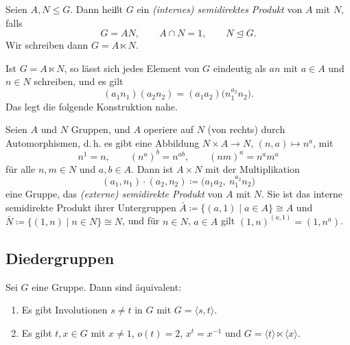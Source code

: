\documentclass[11pt]{article}
\begin{document}
\begin{ergaenzung}
\begin{definition}\Theorem
  Seien $A, N \le G$. Dann heißt $G$ ein \emph{(internes) semidirektes Produkt} von $A$ mit $N$, falls
  \[ G = AN, \qquad A \cap N = 1, \qquad N \trianglelefteq G. \]
  Wir schreiben dann $G = A \ltimes N$.
\end{definition}


\begin{note}
  Ist $G = A \ltimes N$, so lässt sich jedes Element von $G$ eindeutig als $an$ mit $a \in A$ und $n \in N$ schreiben, und es gilt
  \[ (a_1 n_1)(a_2 n_2) = (a_1 a_2)\bigl(n_1^{a_2} n_2\bigr). \]
  Das legt die folgende Konstruktion nahe.
\end{note}

\begin{definition}\Theorem
  Seien $A$ und $N$ Gruppen, und $A$ operiere auf $N$ (von rechts) durch Automorphismen, d.\,h. es gibt eine Abbildung $N \times A \to N$, $(n, a) \mapsto n^a$, mit
  \[ n^1 = n, \qquad (n^a)^b = n^{ab}, \qquad (nm)^a = n^a m^a \]
  für alle $n, m \in N$ und $a, b \in A$. Dann ist $A \times N$ mit der Multiplikation
  \[ (a_1, n_1) \cdot (a_2, n_2) \coloneqq \bigl(a_1 a_2,\ n_1^{a_2} n_2\bigr) \]
  eine Gruppe, das \emph{(externe) semidirekte Produkt} von $A$ mit $N$. Sie ist das interne semidirekte Produkt ihrer Untergruppen $\bar{A} \coloneqq \{(a, 1) \mid a \in A\} \cong A$ und $\bar{N} \coloneqq \{(1, n) \mid n \in N\} \cong N$, und für $n \in N$, $a \in A$ gilt $(1, n)^{(a, 1)} = (1, n^a)$.
\end{definition}
\end{ergaenzung}

\subsection{Diedergruppen}

\begin{ergaenzung}
\begin{lemma}[Diederbedingung]\Theorem
  Sei $G$ eine Gruppe. Dann sind äquivalent:
  \begin{enumerate}[label=(\roman*)]
    \item Es gibt Involutionen $s \neq t$ in $G$ mit $G = \langle s, t \rangle$.
    \item Es gibt $t, x \in G$ mit $x \neq 1$, $o(t) = 2$, $x^t = x^{-1}$ und $G = \langle t \rangle \ltimes \langle x \rangle$.
  \end{enumerate}
\end{lemma}
\end{ergaenzung}
\end{document}
